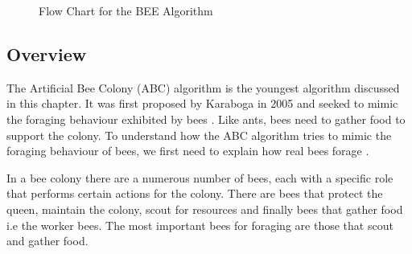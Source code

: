\begin{figure}[p]
	\begin{center}
	\caption{Flow Chart for the BEE Algorithm}
	\label{fig:BeeAlgorithmFlowChart}
	\end{center}
\end{figure}
\subsection{Overview}
The Artificial Bee Colony (ABC) algorithm is the youngest algorithm discussed in this chapter. It was first proposed by Karaboga in 2005 and seeked to mimic the foraging behaviour exhibited by bees \cite{ABCCompareStudy,ABCLeafConstrained,ABCNumericalOptimization}. Like ants, bees need to gather food to support the colony. To understand how the ABC algorithm tries to mimic the foraging behaviour of bees, we first need to explain how real bees forage \cite{ABCCompareStudy}. 

In a bee colony there are a numerous number of bees, each with a specific role that performs certain actions for the colony. There are bees that protect the queen, maintain the colony, scout for resources and finally bees that gather food i.e the worker bees. The most important bees for foraging are those that scout and gather food\cite{ABCCompareStudy}. 

